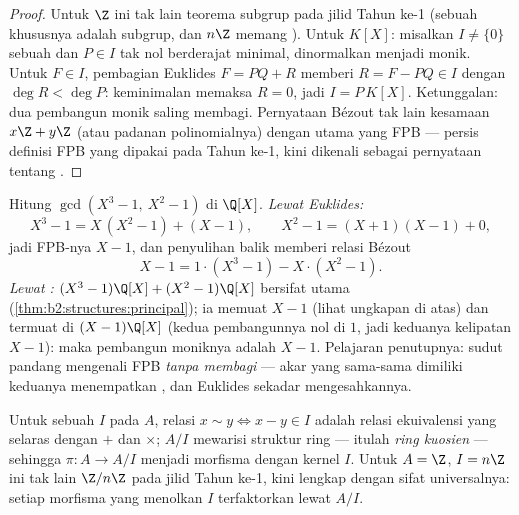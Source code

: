 \begin{proof}
Untuk $\Z$ ini tak lain teorema subgrup pada jilid Tahun ke-1 (sebuah
 khususnya adalah subgrup, dan $n\Z$ memang ). Untuk $K[X]$:
misalkan $I \neq \{0\}$ sebuah  dan $P \in I$ tak nol berderajat
minimal, dinormalkan menjadi monik. Untuk $F \in I$, pembagian Euklides
$F = PQ + R$ memberi $R = F - PQ \in I$ dengan $\deg R < \deg P$:
keminimalan memaksa $R = 0$, jadi $I = P\,K[X]$. Ketunggalan: dua
pembangun monik saling membagi. Pernyataan Bézout tak lain kesamaan
 $x\Z + y\Z$ (atau padanan polinomialnya) dengan  utama yang
 FPB --- persis definisi FPB yang dipakai pada Tahun ke-1, kini
dikenali sebagai pernyataan tentang .
\end{proof}

\begin{example}\label{ex:b2:structures:polygcd}
Hitung $\gcd(X^3 - 1,\ X^2 - 1)$ di $\Q[X]$. \emph{Lewat Euklides:}
\[
X^3 - 1 = X\,(X^2 - 1) + (X - 1),
\qquad
X^2 - 1 = (X + 1)(X - 1) + 0 ,
\]
jadi FPB-nya $X - 1$, dan penyulihan balik memberi relasi
Bézout
\[
X - 1 = 1\cdot(X^3 - 1) - X\cdot(X^2 - 1).
\]
\emph{Lewat :}  $(X^3 - 1)\Q[X] + (X^2 - 1)\Q[X]$ bersifat
utama (\cref{thm:b2:structures:principal}); ia memuat $X - 1$
(lihat ungkapan di atas) dan termuat di $(X - 1)\Q[X]$ (kedua
pembangunnya nol di $1$, jadi keduanya kelipatan $X - 1$): maka
pembangun moniknya adalah $X - 1$. Pelajaran penutupnya: sudut
pandang  mengenali FPB \emph{tanpa membagi} --- akar yang sama-sama
dimiliki keduanya menempatkan , dan Euklides sekadar mengesahkannya.
\end{example}

\begin{definition}\label{def:b2:structures:quotientring}
Untuk sebuah  $I$ pada $A$, relasi $x \sim y \iff x - y \in I$
adalah relasi ekuivalensi yang selaras dengan $+$ dan $\times$;  $A/I$ mewarisi struktur ring --- itulah \emph{ring
kuosien} --- sehingga $\pi \colon A \to A/I$ menjadi
morfisma dengan kernel $I$. Untuk $A = \Z$, $I = n\Z$ ini tak lain
$\Z/n\Z$ pada jilid Tahun ke-1, kini lengkap dengan sifat universalnya:
setiap morfisma yang menolkan $I$ terfaktorkan lewat $A/I$.
\end{definition}

